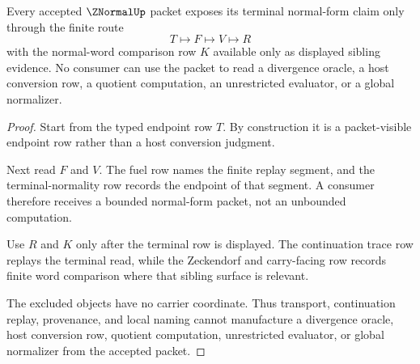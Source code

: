 \begin{theorem}
\label{thm:znormal-fuel-normality-nonescape}
Every accepted $\ZNormalUp$ packet exposes its terminal normal-form claim only through the finite route
$$
T \longmapsto F \longmapsto V \longmapsto R
$$
with the normal-word comparison row $K$ available only as displayed sibling evidence. No consumer can use the packet to read a divergence oracle, a host conversion row, a quotient computation, an unrestricted evaluator, or a global normalizer.
\end{theorem}
\begin{proof}
Start from the typed endpoint row $T$. By construction it is a packet-visible endpoint row rather than a host conversion judgment.

Next read $F$ and $V$. The fuel row names the finite replay segment, and the terminal-normality row records the endpoint of that segment. A consumer therefore receives a bounded normal-form packet, not an unbounded computation.

Use $R$ and $K$ only after the terminal row is displayed. The continuation trace row replays the terminal read, while the Zeckendorf and carry-facing row records finite word comparison where that sibling surface is relevant.

The excluded objects have no carrier coordinate. Thus transport, continuation replay, provenance, and local naming cannot manufacture a divergence oracle, host conversion row, quotient computation, unrestricted evaluator, or global normalizer from the accepted packet.
\end{proof}

